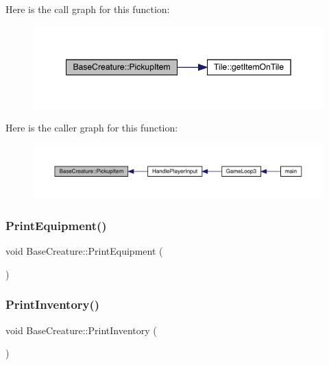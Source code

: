 Here is the call graph for this function\+:
\nopagebreak
\begin{figure}[H]
\begin{center}
\leavevmode
\includegraphics[width=348pt]{d2/d3b/class_base_creature_a2d45724079ff2eeb6606b222e405e4a8_cgraph}
\end{center}
\end{figure}
Here is the caller graph for this function\+:
\nopagebreak
\begin{figure}[H]
\begin{center}
\leavevmode
\includegraphics[width=350pt]{d2/d3b/class_base_creature_a2d45724079ff2eeb6606b222e405e4a8_icgraph}
\end{center}
\end{figure}
\mbox{\label{class_base_creature_ac3d7907a8d8e0967a5881ff180205028}} 
\subsubsection{\texorpdfstring{Print\+Equipment()}{PrintEquipment()}}
{\footnotesize\ttfamily void Base\+Creature\+::\+Print\+Equipment (\begin{DoxyParamCaption}{ }\end{DoxyParamCaption})}

\mbox{\label{class_base_creature_a097ec44d0b215f75ca75ae69c2bd11be}} 
\subsubsection{\texorpdfstring{Print\+Inventory()}{PrintInventory()}}
{\footnotesize\ttfamily void Base\+Creature\+::\+Print\+Inventory (\begin{DoxyParamCaption}{ }\end{DoxyParamCaption})}

